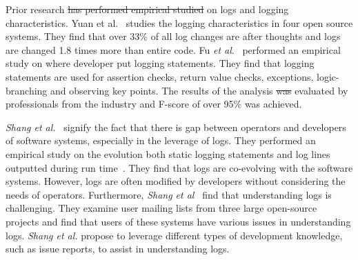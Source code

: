 \documentclass[conference]{IEEEtran}
\providecommand{\DIFadd}[1]{{\protect\color{blue}\uwave{#1}}} %
\providecommand{\DIFdel}[1]{{\protect\color{red}\sout{#1}}}                      %
\providecommand{\DIFaddbegin}{} %
\providecommand{\DIFaddend}{} %
\providecommand{\DIFdelbegin}{} %
\providecommand{\DIFdelend}{} %
\begin{document}

Prior research \DIFdelbegin \DIFdel{has performed empirical studied }\DIFdelend \DIFaddbegin \DIFadd{performs an empirical study  }\DIFaddend on logs and logging characteristics. Yuan et al.~\cite{Characterizinglogs} studies the logging characteristics in four open source systems. They find that over 33\% of all log changes are after thoughts and logs are changed 1.8 times more than entire code. Fu \textsl{et al$.$}~\cite{Fu1} performed an empirical study on where developer put logging statements. They find that logging statements are used for assertion checks, return value checks, exceptions, logic-branching and observing key points. The results of the analysis \DIFdelbegin \DIFdel{was }\DIFdelend \DIFaddbegin \DIFadd{were }\DIFaddend evaluated by professionals from the industry and F-score of over 95\% was achieved. 


\textsl{Shang et al.}~\cite{IanGap} signify the fact that there is gap between operators and developers of software systems, especially in the leverage of logs. They performed an empirical study on the evolution both static logging statements and log lines outputted during run time~\cite{EMSEIAN, SMR:SMR1579}. They find that logs are co-evolving with the software systems. However, logs are often modified by developers without considering the needs of operators. Furthermore, \textsl{Shang et al}~\cite{IanIcesm} find that understanding logs is challenging. They examine user mailing lists from three large open-source projects and find that users of these systems have various issues in understanding logs. \textsl{Shang et al.} propose to leverage different types of development knowledge, such as issue reports, to assist in understanding logs. 
\end{document}
